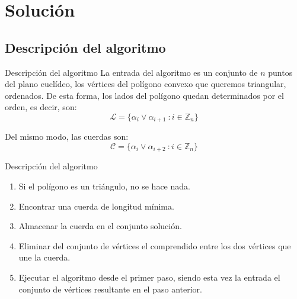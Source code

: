 \documentclass[compress]{beamer}
\begin{document}
\section{Solución}

\subsection{Descripción del algoritmo}

\begin{frame}{Descripción del algoritmo}
	La entrada del algoritmo es un conjunto de $n$ puntos del plano euclídeo, los vértices del polígono convexo que queremos triangular, ordenados. De esta forma, los lados del polígono quedan determinados por el orden, es decir, son: 
\[\mathcal{L} = \{\alpha_i \vee \alpha_{i+1}\ :  i\in \mathbb{Z}_n\}\]

Del mismo modo, las cuerdas son:
\[\mathcal{C} = \{\alpha_i \vee \alpha_{i+2}\ : i\in \mathbb{Z}_n\}\]
\end{frame}

\begin{frame}{Descripción del algoritmo}

\begin{enumerate}
    \item Si el polígono es un triángulo, no se hace nada.
	\item Encontrar una cuerda de longitud mínima.
	\item Almacenar la cuerda en el conjunto solución.
	\item Eliminar del conjunto de vértices el comprendido entre los dos vértices que une la cuerda.
	\item Ejecutar el algoritmo desde el primer paso, siendo esta vez la entrada el conjunto de vértices resultante en el paso anterior.
\end{enumerate}

\end{frame}
\end{document}

